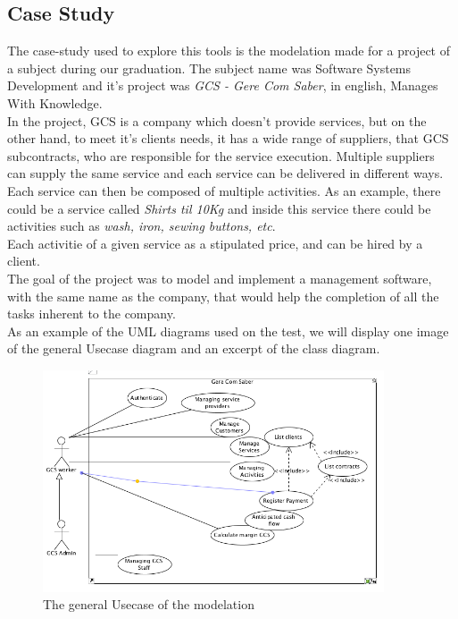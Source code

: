 \subsection*{Case Study}

The case-study used to explore this tools is the modelation made for a project of a subject during our graduation. The subject name was Software Systems Development and it's project was \textit{GCS - Gere Com Saber}, in english, Manages With Knowledge.\\
In the project, GCS is a company which doesn't provide services, but on the other hand, to meet it's clients needs, it has a wide range of suppliers, that GCS subcontracts, who are responsible for the service execution. Multiple suppliers can supply the same service and each  service can be delivered in different ways. Each service can then be composed of multiple activities. As an example, there could be a service called \textit{Shirts til 10Kg} and inside this service there could be activities such as \textit{wash, iron, sewing buttons, etc}.\\
Each activitie of a given service as a stipulated price, and can be hired by a client.\\
The goal of the project was to model and implement a management software, with the same name as the company, that would help the completion of all the tasks inherent to the company.\\

As an example of the UML diagrams used on the test, we will display one image of the general Usecase diagram and an excerpt of the class diagram.

\begin{figure}[H]
\begin{center}
\includegraphics[width=0.9\textwidth]{images/usecase.png}
\caption{The general Usecase of the modelation}\label{img:usecase}
\end{center}
\end{figure} 

